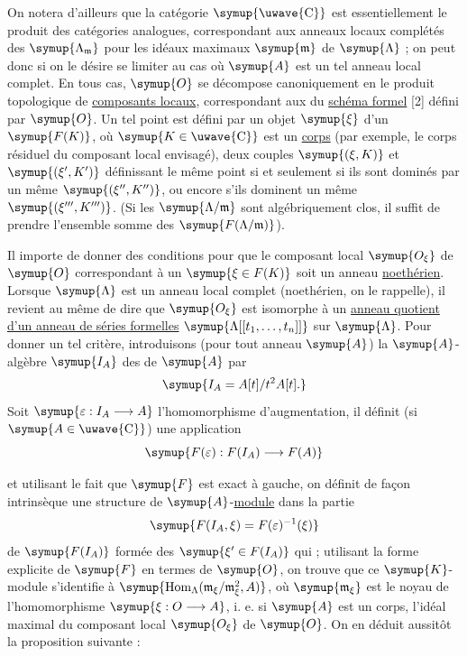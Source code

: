 On notera d'ailleurs que la catégorie $\symup{\text{\uwave{C}}}$ est essentiellement le
produit des catégories analogues, correspondant aux anneaux locaux complétés
des $\symup{\Lambda_{\mathfrak m}}$ pour les idéaux maximaux $\symup{\mathfrak m}$ de
$\symup{\Lambda}$ ; on peut donc si on le désire se limiter au cas où $\symup{A}$ est un tel anneau local complet. En tous cas, $\symup{O}$ se décompose canoniquement en le
produit topologique de \uline{composants locaux}, correspondant aux  du
\uline{schéma formel} [2] défini par $\symup{O}$. Un tel point est défini par un objet $\symup{\xi}$
d'un $\symup{F(K)}$, où $\symup{K\in\text{\uwave{C}}}$ est un \uline{corps} (par exemple, le corps résiduel
du composant local envisagé), deux couples $\symup{(\xi,K)}$ et $\symup{(\xi',K')}$
définissant le même point si et seulement si ils sont dominés par un même
$\symup{(\xi'',K'')}$, ou encore s'ils dominent un même $\symup{(\xi''',K''')}$. (Si les
$\symup{\Lambda/\mathfrak m}$ sont algébriquement clos, il suffit de prendre l'ensemble
somme des $\symup{F(\Lambda/\mathfrak m)}$).

Il importe de donner des conditions pour que le composant local $\symup{O_\xi}$ de
$\symup{O}$ correspondant à un $\symup{\xi\in F(K)}$ soit un anneau \uline{noethérien}. Lorsque
$\symup{\Lambda}$ est un anneau local complet (noethérien, on le rappelle), il revient
au même de dire que $\symup{O_\xi}$ est isomorphe à un \uline{anneau quotient d'un anneau de séries formelles} $\symup{\Lambda[[t_1,\ldots,t_n]]}$ sur $\symup{\Lambda}$. Pour donner un tel
critère, introduisons (pour tout anneau $\symup{A}$) la $\symup{A}$-algèbre $\symup{I_A}$ des  de $\symup{A}$ par
\[
  \symup{I_A=A[t]/t^2A[t].}
\]
Soit $\symup{\varepsilon:I_A\longrightarrow A}$ l'homomorphisme d'augmentation, il
définit (si $\symup{A\in\text{\uwave{C}}}$) une application
\[
  \symup{F(\varepsilon):F(I_A)\longrightarrow F(A)}
\]

et utilisant le fait que $\symup{F}$ est exact à gauche, on définit de façon
intrinsèque une structure de $\symup{A}$-\uline{module} dans la partie
\[
  \symup{F(I_A,\xi)=F(\varepsilon)^{-1}(\xi)}
\]
de $\symup{F(I_A)}$ formée des $\symup{\xi'\in F(I_A)}$ qui  ;
utilisant la forme explicite de $\symup{F}$ en termes de $\symup{O}$, on trouve que ce
$\symup{K}$-module s'identifie à $\symup{\operatorname{Hom}_{\Lambda}(\mathfrak m_\xi/\mathfrak m_\xi^2,A)}$, où $\symup{\mathfrak m_\xi}$ est le noyau de l'homomorphisme
$\symup{\xi:O\longrightarrow A}$, i. e. si $\symup{A}$ est un corps, l'idéal maximal du
composant local $\symup{O_\xi}$ de $\symup{O}$. On en déduit aussitôt la proposition suivante :


